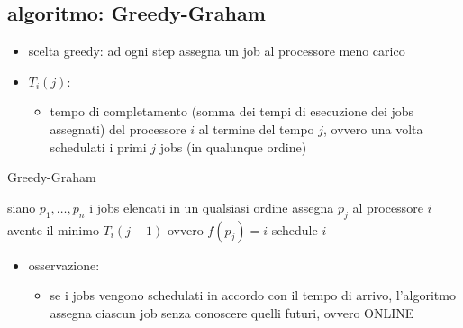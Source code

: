 
\subsection*{algoritmo: Greedy-Graham}
\begin{flushleft}
	\begin{itemize}
		\item scelta greedy: ad ogni step assegna un job al processore meno carico
		\item $T_i(j)$:
		\begin{itemize}
			\item tempo di completamento (somma dei tempi di esecuzione dei jobs assegnati) del processore $i$ al termine del tempo $j$, ovvero una volta schedulati i primi $j$ jobs (in qualunque ordine)
		\end{itemize}
	\end{itemize}
	\begin{algorithm}
		\caption{Greedy-Graham}
		\begin{algorithmic}
			\STATE siano $p_1,\ldots,p_n$ i jobs elencati in un qualsiasi ordine
				\STATE assegna $p_j$ al processore $i$ avente il minimo $T_i(j-1)$ ovvero $f(p_j)=i$
			\ENDFOR
			\RETURN schedule $i$
		\end{algorithmic}
	\end{algorithm}
	\begin{itemize}
		\item osservazione:
		\begin{itemize}
			\item se i jobs vengono schedulati in accordo con il tempo di arrivo, l'algoritmo assegna ciascun job senza conoscere quelli futuri, ovvero ONLINE
		\end{itemize}
	\end{itemize}
\end{flushleft}


